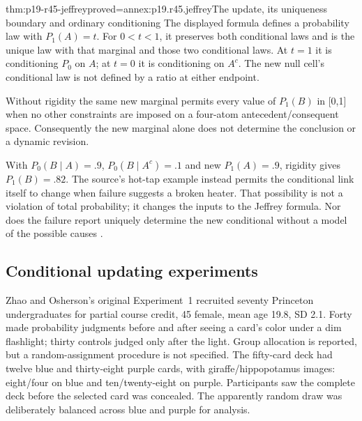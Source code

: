 \begin{hbtheorem}{thm:p19-r45-jeffrey}{proved=annex:p19.r45.jeffrey}{The update, its uniqueness boundary and ordinary conditioning}
The displayed formula defines a probability law with \(P_1(A)=t\).
For \(0<t<1\), it preserves both conditional laws and is the unique
law with that marginal and those two conditional laws. At \(t=1\)
it is conditioning \(P_0\) on \(A\); at \(t=0\) it is
conditioning on \(A^c\). The new null cell's conditional law is not
defined by a ratio at either endpoint.

Without rigidity the same new marginal permits every value of
\(P_1(B)\) in [0,1] when no other constraints are imposed on a
four-atom antecedent/consequent space. Consequently the new marginal
alone does not determine the conclusion or a dynamic revision.
\end{hbtheorem}

With \(P_0(B\mid A)=.9\), \(P_0(B\mid A^c)=.1\) and
new \(P_1(A)=.9\), rigidity gives \(P_1(B)=.82\).
The source's hot-tap example instead permits the conditional link itself
to change when failure suggests a broken heater. That possibility is
not a violation of total probability; it changes the inputs to the
Jeffrey formula. Nor does the failure report uniquely determine the
new conditional without a model of the possible causes
\cite[pp.~287--288]{ChaterOaksford2021BayesianReasoning}.

\subsection{Conditional updating experiments}
\label{sec:p19-r45-updating-studies}

Zhao and Osherson's original Experiment~1 recruited seventy Princeton
undergraduates for partial course credit, 45 female, mean age 19.8,
SD 2.1. Forty made probability judgments before and after seeing a
card's color under a dim flashlight; thirty controls judged only after
the light. Group allocation is reported, but a random-assignment
procedure is not specified. The fifty-card deck had twelve blue and
thirty-eight purple cards, with giraffe/hippopotamus images: eight/four
on blue and ten/twenty-eight on purple. Participants saw the complete
deck before the selected card was concealed. The apparently random
draw was deliberately balanced across blue and purple for analysis.


